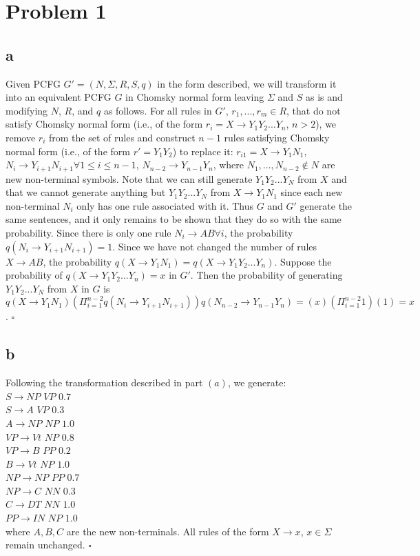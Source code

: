 \documentclass[twoside]{homework}
\begin{document}
\maketitle

\section*{Problem 1}
\subsection*{a}
Given PCFG $G' = (N, \Sigma, R, S, q)$ in the form described, we will transform it into an equivalent PCFG $G$ in Chomsky normal form leaving $\Sigma$ and $S$ as is and modifying $N$, $R$, and $q$ as follows.  For all rules in $G'$, $r_1,...,r_m \in R$, that do not satisfy Chomsky normal form (i.e., of the form $r_i = X \rightarrow Y_1Y_2...Y_n$, $n > 2$), we remove $r_i$ from the set of rules and construct $n-1$ rules satisfying Chomsky normal form (i.e., of the form $r' = Y_1Y_2$) to replace it: $r_{i1} = X \rightarrow Y_1N_1$, $N_i \rightarrow Y_{i+1}N_{i+1} \forall 1 \leq i \leq n-1$, $N_{n-2} \rightarrow Y_{n-1}Y_n$, where $N_1,...,N_{n-2} \notin N$ are new non-terminal symbols.  Note that we can still generate $Y_1Y_2...Y_N$ from $X$ and that we cannot generate anything but $Y_1Y_2...Y_N$ from $X \rightarrow Y_1N_1$ since each new non-terminal $N_i$ only has one rule associated with it.  Thus $G$ and $G'$ generate the same sentences, and it only remains to be shown that they do so with the same probability.  Since there is only one rule $N_i \rightarrow AB \forall i$, the probability $q(N_i \rightarrow Y_{i+1}N_{i+1}) = 1$.  Since we have not changed the number of rules $X \rightarrow AB$, the probability $q(X \rightarrow Y_1N_1) = q(X \rightarrow Y_1Y_2...Y_n)$.  Suppose the probability of $q(X \rightarrow Y_1Y_2...Y_n) = x$ in $G'$.  Then the probability of generating  $Y_1Y_2...Y_N$ from $X$ in $G$ is $q(X \rightarrow Y_1N_1)(\Pi_{i=1}^{n-2}q(N_i \rightarrow Y_{i+1}N_{i+1}))q(N_{n-2} \rightarrow Y_{n-1}Y_n) = (x)(\Pi_{i=1}^{n-2}1)(1) = x$.
$\square$
\subsection*{b}
Following the transformation described in part $(a)$, we generate: \\
$S \rightarrow NP$ $VP$ $0.7$ \\
$S \rightarrow A$ $VP$ $0.3$ \\
$A \rightarrow NP$ $NP$ $1.0$ \\
$VP \rightarrow Vt$ $NP$ $0.8$ \\
$VP \rightarrow B$ $PP$ $0.2$ \\
$B \rightarrow Vt$ $NP$ $1.0$ \\
$NP \rightarrow NP$ $PP$ $0.7$ \\
$NP \rightarrow C$ $NN$ $0.3$ \\
$C \rightarrow DT$ $NN$ $1.0$ \\
$PP \rightarrow IN$ $NP$ $1.0$ \\
where $A, B, C$ are the new non-terminals.  All rules of the form $X \rightarrow x$, $x \in \Sigma$ remain unchanged.
$\square$
\end{document}
